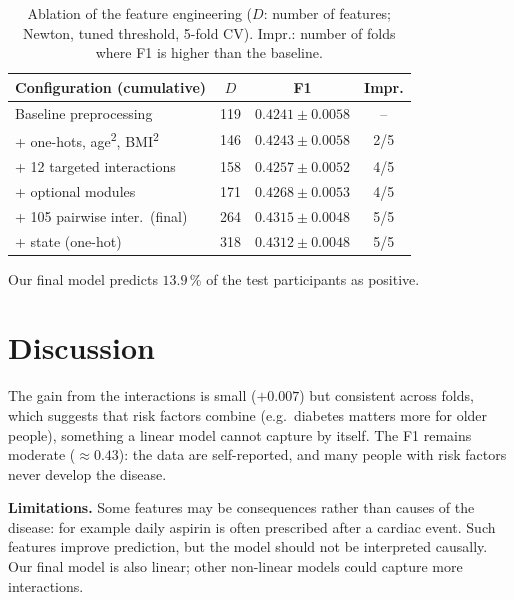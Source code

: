 \documentclass[10pt,conference,compsocconf]{IEEEtran}
\begin{document}
\begin{table}[htbp]
  \centering
  \caption{Ablation of the feature engineering ($D$: number of features; Newton, tuned threshold, 5-fold CV).
  Impr.: number of folds where F1 is higher than the baseline.}
  \label{tab:ablation}
  \footnotesize\setlength{\tabcolsep}{2.5pt}
  \begin{tabular}{lccc}
    \toprule
    Configuration (cumulative) & $D$ & F1 & Impr. \\
    \midrule
    Baseline preprocessing & 119 & $0.4241 \pm 0.0058$ & -- \\
    + one-hots, age\textsuperscript{2}, BMI\textsuperscript{2} & 146 & $0.4243 \pm 0.0058$ & 2/5 \\
    + 12 targeted interactions & 158 & $0.4257 \pm 0.0052$ & 4/5 \\
    + optional modules & 171 & $0.4268 \pm 0.0053$ & 4/5 \\
    + 105 pairwise inter.\ (final) & 264 & $\mathbf{0.4315 \pm 0.0048}$ & 5/5 \\
    + state (one-hot) & 318 & $0.4312 \pm 0.0048$ & 5/5 \\
    \bottomrule
  \end{tabular}
\end{table}

Our final model predicts $13.9\,\%$ of the test participants as positive.

\section{Discussion}
The gain from the interactions is small ($+0.007$) but consistent across folds, which
suggests that risk factors combine (e.g.\ diabetes matters more for older people),
something a linear model cannot capture by itself. The F1 remains moderate
($\approx 0.43$): the data are self-reported, and many people with risk factors never
develop the disease.

\textbf{Limitations.} Some features may be consequences rather than causes of the
disease: for example daily aspirin is often prescribed after a cardiac event. Such
features improve prediction, but the model should not be interpreted causally. Our final
model is also linear; other non-linear models could capture more interactions.
\end{document}
